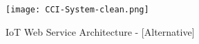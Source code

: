\begin{figure}[!h]
    \centering
    \texttt{[image: CCI-System-clean.png]}
    \caption{IoT Web Service Architecture - [Alternative]}\label{fig::archalt}
\end{figure}